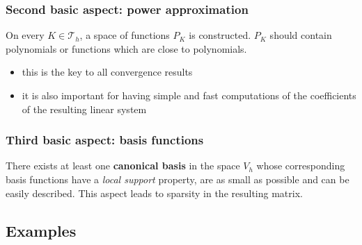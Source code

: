 \subsubsection*{Second basic aspect: power approximation}
On every $K \in \mathcal{T}_h$, a space of functions $P_K$ is constructed. $P_K$ should contain polynomials or functions which are close to polynomials.
\begin{itemize}
  \item this is the key to all convergence results 
  \item it is also important for having simple and fast computations of the coefficients of the resulting linear system 
\end{itemize}
\subsubsection*{Third basic aspect: basis functions}
There exists at least one \textbf{canonical basis} in the space $V_h$ whose corresponding basis functions have a \textit{local support} property, are as small as possible and can be easily described.
This aspect leads to sparsity in the resulting matrix.

\newpage
\subsection{Examples}

